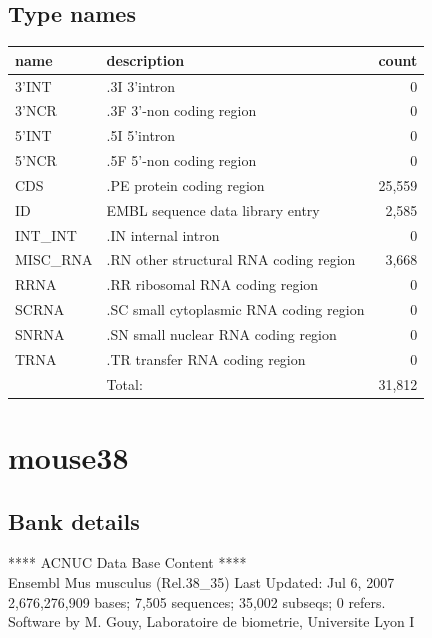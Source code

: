 \documentclass{article}
\begin{document}
\begin{Schunk}
\subsection{Type names}
\noindent\begin{tabular}{llr}
\hline \hline
name & description & count \\
\hline
3'INT  &  .3I 3'intron  &  0 \\
3'NCR  &  .3F  3'-non coding region  &  0 \\
5'INT  &  .5I 5'intron  &  0 \\
5'NCR  &  .5F  5'-non coding region  &  0 \\
CDS  &  .PE protein coding region  &  25,559 \\
ID  &  EMBL sequence data library entry  &  2,585 \\
INT\_INT  &  .IN  internal intron  &  0 \\
MISC\_RNA  &  .RN other structural RNA coding region  &  3,668 \\
RRNA  &  .RR ribosomal RNA coding region  &  0 \\
SCRNA  &  .SC small cytoplasmic RNA coding region  &  0 \\
SNRNA  &  .SN small nuclear RNA coding region  &  0 \\
TRNA  &  .TR transfer RNA coding region  &  0 \\
\hline
 & Total: & 31,812 \\
\hline \hline
\end{tabular}

\section{ mouse38 }
\subsection{Bank details}
             ****     ACNUC Data Base Content      ****                         \\
          Ensembl Mus musculus (Rel.38\_35) Last Updated: Jul  6, 2007\\
2,676,276,909 bases; 7,505 sequences; 35,002 subseqs; 0 refers.\\
Software by M. Gouy, Laboratoire de biometrie, Universite Lyon I 


\end{Schunk}
\end{document}

